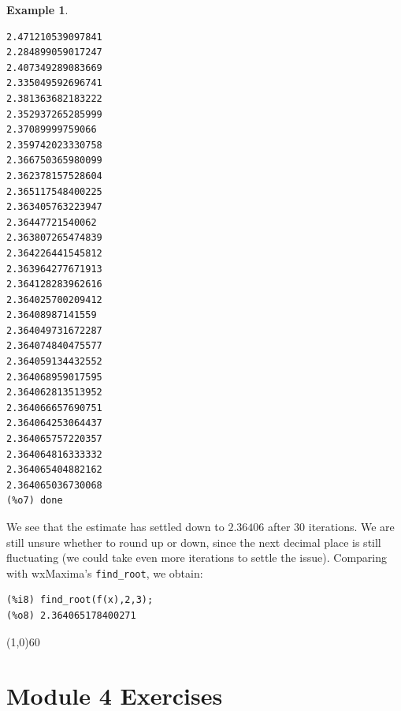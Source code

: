 \documentclass[10.5pt,twoside]{report}
\theoremstyle{definition}
\newtheorem{exmp}{Example}[section]
\begin{document}
\begin{exmp}
\begin{verbatim}
2.471210539097841
2.284899059017247
2.407349289083669
2.335049592696741
2.381363682183222
2.352937265285999
2.37089999759066
2.359742023330758
2.366750365980099
2.362378157528604
2.365117548400225
2.363405763223947
2.36447721540062
2.363807265474839
2.364226441545812
2.363964277671913
2.364128283962616
2.364025700209412
2.36408987141559
2.364049731672287
2.364074840475577
2.364059134432552
2.364068959017595
2.364062813513952
2.364066657690751
2.364064253064437
2.364065757220357
2.364064816333332
2.364065404882162
2.364065036730068
(%o7) done
\end{verbatim}

We see that the estimate has settled down to $2.36406$ after 30 iterations.  We are still unsure whether to round up or down, since the next decimal place is still fluctuating (we could take even more iterations to settle the issue).  Comparing with wxMaxima's \verb|find_root|, we obtain:

\begin{verbatim}
(%i8) find_root(f(x),2,3);
(%o8) 2.364065178400271
\end{verbatim}


\end{exmp}

\line(1,0){60}
\linethickness{0.5mm}

\pagebreak


\section{Module 4 Exercises}\label{Module 4 Exercises}
\end{document}
